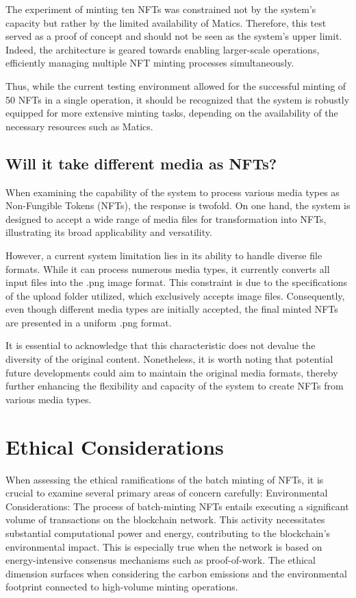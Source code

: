 \documentclass[10pt,twocolumn]{article}
\begin{document}
The experiment of minting ten NFTs was constrained not by the system's capacity but rather by the limited availability of Matics. Therefore, this test served as a proof of concept and should not be seen as the system's upper limit. Indeed, the architecture is geared towards enabling larger-scale operations, efficiently managing multiple NFT minting processes simultaneously. 

Thus, while the current testing environment allowed for the successful minting of 50 NFTs in a single operation, it should be recognized that the system is robustly equipped for more extensive minting tasks, depending on the availability of the necessary resources such as Matics.

\subsection{Will it take different media as NFTs?} 
When examining the capability of the system to process various media types as Non-Fungible Tokens (NFTs), the response is twofold. On one hand, the system is designed to accept a wide range of media files for transformation into NFTs, illustrating its broad applicability and versatility.

However, a current system limitation lies in its ability to handle diverse file formats. While it can process numerous media types, it currently converts all input files into the .png image format. This constraint is due to the specifications of the upload folder utilized, which exclusively accepts image files. Consequently, even though different media types are initially accepted, the final minted NFTs are presented in a uniform .png format.

It is essential to acknowledge that this characteristic does not devalue the diversity of the original content. Nonetheless, it is worth noting that potential future developments could aim to maintain the original media formats, thereby further enhancing the flexibility and capacity of the system to create NFTs from various media types. 

\section{Ethical Considerations}
When assessing the ethical ramifications of the batch minting of NFTs, it is crucial to examine several primary areas of concern carefully:
Environmental Considerations: The process of batch-minting NFTs entails executing a significant volume of transactions on the blockchain network. This activity necessitates substantial computational power and energy, contributing to the blockchain's environmental impact. This is especially true when the network is based on energy-intensive consensus mechanisms such as proof-of-work. The ethical dimension surfaces when considering the carbon emissions and the environmental footprint connected to high-volume minting operations.
\end{document}
